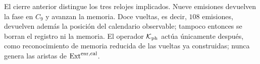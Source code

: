El cierre anterior distingue los tres relojes implicados. Nueve emisiones
devuelven la fase en \(C_9\) y avanzan la memoria. Doce vueltas, es decir,
\(108\) emisiones, devuelven además la posición del calendario observable;
tampoco entonces se borran el registro ni la memoria. El operador
\(\mathcal K_{\rm ph}\) actúa únicamente después, como reconocimiento de
memoria reducida de las vueltas ya construidas; nunca genera las aristas de
\(\operatorname{Ext}^{\rm enr,cal}\).
